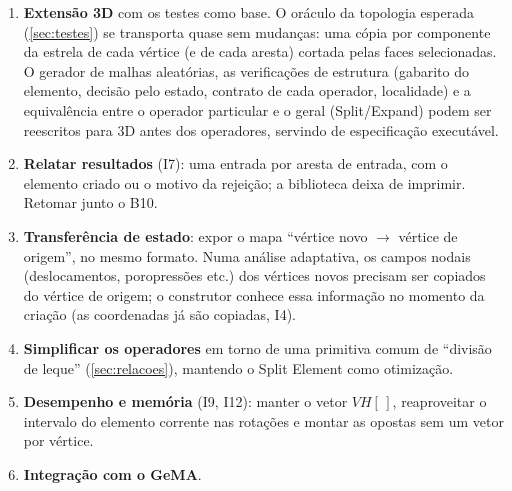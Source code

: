 \begin{enumerate}
\item \textbf{Extensão 3D} com os testes como base. O oráculo da topologia esperada (\cref{sec:testes}) se transporta
quase sem mudanças: uma cópia por componente da estrela de cada vértice (e de cada aresta) cortada pelas faces
selecionadas. O gerador de malhas aleatórias, as verificações de estrutura (gabarito do elemento, decisão pelo estado,
contrato de cada operador, localidade) e a equivalência entre o operador particular e o geral (Split/Expand) podem ser
reescritos para 3D antes dos operadores, servindo de especificação executável.
\item \textbf{Relatar resultados} (I7): uma entrada por aresta de entrada, com o elemento criado ou o motivo da
rejeição; a biblioteca deixa de imprimir. Retomar junto o B10.
\item \textbf{Transferência de estado}: expor o mapa ``vértice novo $\to$ vértice de origem'', no mesmo formato. Numa
análise adaptativa, os campos nodais (deslocamentos, poropressões etc.) dos vértices novos precisam ser copiados do
vértice de origem; o construtor conhece essa informação no momento da criação (as coordenadas já são copiadas, I4).
\item \textbf{Simplificar os operadores} em torno de uma primitiva comum de ``divisão de leque'' (\cref{sec:relacoes}),
mantendo o Split Element como otimização.
\item \textbf{Desempenho e memória} (I9, I12): manter o vetor $VH[\,]$, reaproveitar o intervalo do elemento corrente
nas rotações e montar as opostas sem um vetor por vértice.
\item \textbf{Integração com o GeMA}.
\end{enumerate}
